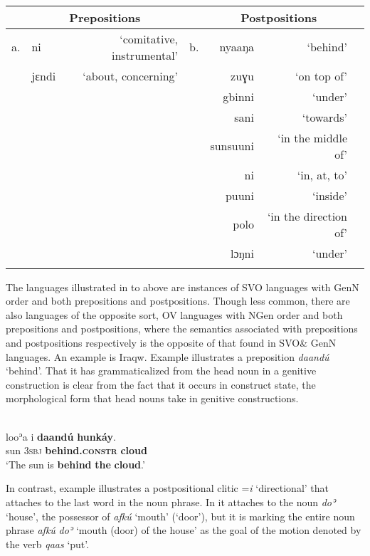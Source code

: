\documentclass[output=paper]{langsci/langscibook}
\begin{document}
\begin{table}
\\
\begin{tabularx}{\textwidth}{Xlrrrrr} 
\lsptoprule
  & \multicolumn{2}{c}{\bfseries Prepositions} &  & \multicolumn{2}{c}{\bfseries Postpositions}\\
\midrule
a. & ni & ‘comitative, instrumental’ & b. & nyaaŋa & ‘behind’\\
 & jɛndi & ‘about, concerning’ &  & zuɣu & ‘on top of’\\
 &  &  &  & gbinni & ‘under’\\
 &  &  &  & sani & ‘towards’\\
 &  &  &  & sunsuuni & ‘in the middle of’\\
 &  &  &  & ni & ‘in, at, to’\\
 &  &  &  & puuni & ‘inside’\\
 &  &  &  & polo & ‘in the direction of’\\
 &  &  &  & lɔŋni & ‘under’\\
\lspbottomrule
\end{tabularx}
\end{table}


The languages illustrated in  to  above are instances of SVO languages with GenN order and both prepositions and postpositions. Though less common, there are also languages of the opposite sort, OV languages with NGen order and both prepositions and postpositions, where the semantics associated with prepositions and postpositions respectively is the opposite of that found in SVO\& GenN languages. An example is Iraqw. Example  illustrates a preposition \textit{daandú} ‘behind’. That it has grammaticalized from the head noun in a genitive construction is clear from the fact that it occurs in construct state, the morphological form that head nouns take in genitive constructions.

\ea\label{ex:dryer:}
\\
\gll   looʾa  i  \textbf{daandú}  \textbf{hunkáy}.\\
       sun  3\textsc{sbj}  \textbf{behind.\textsc{constr}}  \textbf{cloud} \\
\glt ‘The sun is \textbf{behind} \textbf{the} \textbf{cloud}.’
\z

In contrast, example  illustrates a postpositional clitic =\textit{i} ‘directional’ that attaches to the last word in the noun phrase. In  it attaches to the noun \textit{doʾ} ‘house’, the possessor of \textit{afkú} ‘mouth’ (‘door’), but it is marking the entire noun phrase \textit{afkú} \textit{doʾ} ‘mouth (door) of the house’ as the goal of the motion denoted by the verb \textit{qaas} ‘put’.
\end{document}
